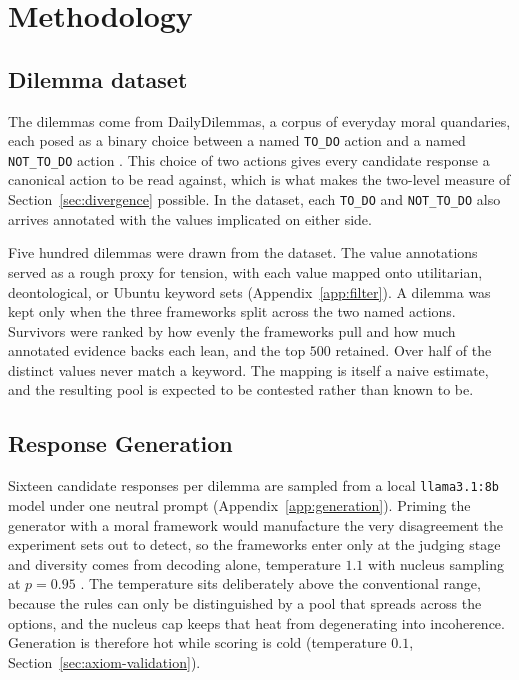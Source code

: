 \documentclass[10pt,twocolumn,a4paper]{article}
\let\cite\citep
\begin{document}
\section{Methodology}
\label{sec:method}


\subsection{Dilemma dataset}
\label{sec:dataset}

The dilemmas come from DailyDilemmas, a corpus of everyday moral
quandaries, each posed as a binary choice between a named
\texttt{TO\_DO} action and a named \texttt{NOT\_TO\_DO} action
\cite{dailydilemmas2024}. This choice of two actions gives every candidate response a canonical action to be read
against, which is what makes the two-level measure of
Section~\ref{sec:divergence} possible. In the dataset, each \texttt{TO\_DO} and \texttt{NOT\_TO\_DO} 
also arrives annotated with the values implicated on either side.

Five hundred dilemmas were drawn from the dataset. The
value annotations served as a rough proxy for tension, with each value
mapped onto utilitarian, deontological, or Ubuntu keyword sets
(Appendix~\ref{app:filter}). A
dilemma was kept only when the three frameworks split across the two
named actions. Survivors were ranked by how evenly the frameworks pull
and how much annotated evidence backs each lean, and the top $500$
retained. Over
half of the distinct values never match a keyword. The mapping is
itself a naive estimate, and the resulting pool is expected to be contested
rather than known to be.

\subsection{Response Generation}
\label{sec:generation}
Sixteen candidate responses per dilemma are sampled from a local
\texttt{llama3.1:8b} model under one neutral prompt \cite{dubey2024}
(Appendix~\ref{app:generation}). Priming the
generator with a moral framework would manufacture the very
disagreement the experiment sets out to detect, so the frameworks enter
only at the judging stage and diversity comes from decoding alone,
temperature $1.1$ with nucleus sampling at $p = 0.95$
\cite{holtzman2020}. The temperature
sits deliberately above the conventional range, because the rules can
only be distinguished by a pool that spreads across the options, and the
nucleus cap keeps that heat from degenerating into incoherence.
Generation is therefore hot while scoring is cold (temperature $0.1$,
Section~\ref{sec:axiom-validation}).
\end{document}
